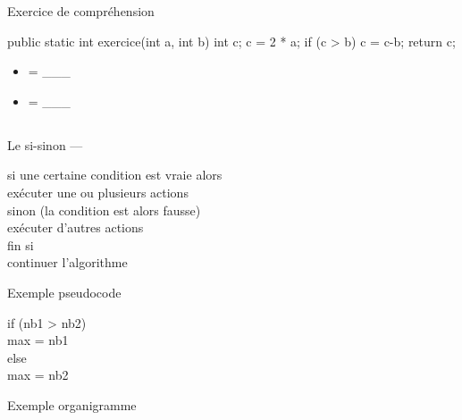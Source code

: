 \begin{frame}[fragile]{Exercice de compréhension}
  \begin{java}
public static int exercice(int a, int b) {
  int c;
  c = 2 * a;
  if (c > b) {
      c = c-b;
  }
  return c;
}
  \end{java}

  \begin{multicols}{2}
    \begin{itemize}[<+->]
      \item {} = \_\_\_
      \item {} = \_\_\_
    \end{itemize}
  \end{multicols}
\end{frame}

\subsection{}
\begin{frame}{Le si-sinon --- }
  \begin{langagenaturel}
    si une certaine condition est vraie alors\\
      \tab exécuter une ou plusieurs actions\\
    sinon (la condition est alors fausse)\\
      \tab exécuter d'autres actions\\
    fin si\\
    continuer l'algorithme
  \end{langagenaturel}
\end{frame}

\begin{frame}{Exemple pseudocode}
  \begin{langagenaturel}
    if (nb1 > nb2)\\
      \tab max = nb1\\
    else\\
      \tab max = nb2
  \end{langagenaturel}
\end{frame}

\begin{frame}{Exemple organigramme}
  \begin{center}
  \end{center}
\end{frame}

